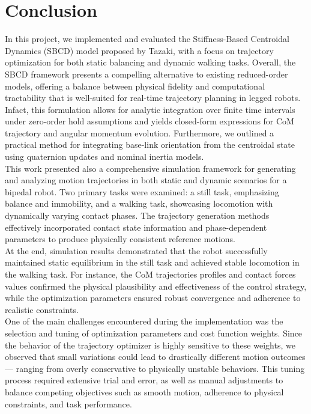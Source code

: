 \documentclass[main.tex]{subfiles}
\begin{document}
\section{Conclusion}\label{sec:conclusion}
\begin{sloppypar}
    In this project, we implemented and evaluated the Stiffness-Based Centroidal Dynamics (SBCD) model proposed by Tazaki, with a focus on trajectory optimization for both static balancing and dynamic walking tasks. 
    Overall, the SBCD framework presents a compelling alternative to existing reduced-order models, offering a balance between physical fidelity and computational tractability that is well-suited for real-time trajectory planning in legged robots.
    Infact, this formulation allows for analytic integration over finite time intervals under zero-order hold assumptions and yields closed-form expressions for CoM trajectory and angular momentum evolution. Furthermore, we outlined a practical method for integrating base-link orientation from the centroidal state using quaternion updates and nominal inertia models. \\This work presented also a comprehensive simulation framework for generating and analyzing motion trajectories in both static and dynamic scenarios for a bipedal robot. Two primary tasks were examined: a still task, emphasizing balance and immobility, and a walking task, showcasing locomotion with dynamically varying contact phases. The trajectory generation methods effectively incorporated contact state information and phase-dependent parameters to produce physically consistent reference motions. 
    \\At the end, simulation results demonstrated that the robot successfully maintained static equilibrium in the still task and achieved stable locomotion in the walking task. For instance, the CoM trajectories profiles and contact forces values confirmed the physical plausibility and effectiveness of the control strategy, while the optimization parameters ensured robust convergence and adherence to realistic constraints. 
    \\One of the main challenges encountered during the implementation was the selection and tuning of optimization parameters and cost function weights. Since the behavior of the trajectory optimizer is highly sensitive to these weights, we observed that small variations could lead to drastically different motion outcomes — ranging from overly conservative to physically unstable behaviors. This tuning process required extensive trial and error, as well as manual adjustments to balance competing objectives such as smooth motion, adherence to physical constraints, and task performance. 

\end{sloppypar}
\end{document}
